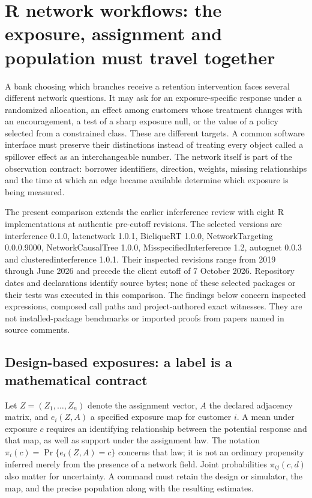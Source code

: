 \section{R network workflows: the exposure, assignment and population must travel together}
\label{sec:exec25-r-network}

A bank choosing which branches receive a retention intervention faces several different network questions. It may ask for an exposure-specific response under a randomized allocation, an effect among customers whose treatment changes with an encouragement, a test of a sharp exposure null, or the value of a policy selected from a constrained class. These are different targets. A common software interface must preserve their distinctions instead of treating every object called a spillover effect as an interchangeable number. The network itself is part of the observation contract: borrower identifiers, direction, weights, missing relationships and the time at which an edge became available determine which exposure is being measured.

The present comparison extends the earlier inferference review with eight R implementations at authentic pre-cutoff revisions. The selected versions are interference 0.1.0, latenetwork 1.0.1, BicliqueRT 1.0.0, NetworkTargeting 0.0.0.9000, NetworkCausalTree 1.0.0, MisspecifiedInterference 1.2, autognet 0.0.3 and clusteredinterference 1.0.1. Their inspected revisions range from 2019 through June 2026 and precede the client cutoff of 7 October 2026. Repository dates and declarations identify source bytes; none of these selected packages or their tests was executed in this comparison. The findings below concern inspected expressions, composed call paths and project-authored exact witnesses. They are not installed-package benchmarks or imported proofs from papers named in source comments.~\citep{exec24_interference_inferference,exec25_rnet_exposure,exec25_rnet_late,exec25_rnet_biclique,exec25_rnet_target,exec25_rnet_tree,exec25_rnet_nmr,exec25_rnet_auto,exec25_rnet_cluster}

\subsection{Design-based exposures: a label is a mathematical contract}

Let $Z=(Z_1,\ldots,Z_n)$ denote the assignment vector, $A$ the declared adjacency matrix, and $e_i(Z,A)$ a specified exposure map for customer $i$. A mean under exposure $c$ requires an identifying relationship between the potential response and that map, as well as support under the assignment law. The notation $\pi_i(c)=\Pr\{e_i(Z,A)=c\}$ concerns that law; it is not an ordinary propensity inferred merely from the presence of a network field. Joint probabilities $\pi_{ij}(c,d)$ also matter for uncertainty. A command must retain the design or simulator, the map, and the precise population along with the resulting estimates.

